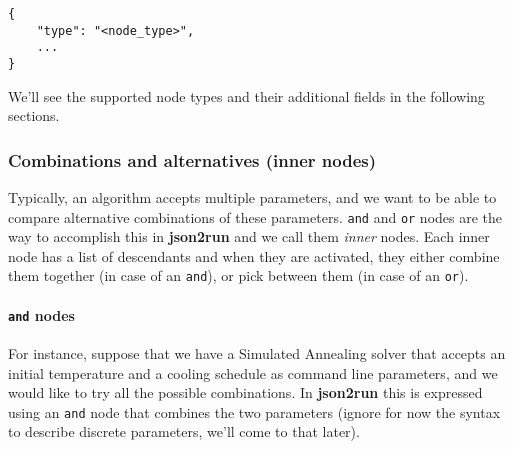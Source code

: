 \documentclass[11pt,notitlepage,twoside,a4paper]{article}
\begin{document}
\begin{lstlisting} 
{
    "type": "<node_type>",
    ... 
}
\end{lstlisting}

\noindent
We'll see the supported node types and their additional fields in the
following sections.

\subsubsection{Combinations and alternatives (inner nodes)}

Typically, an algorithm accepts multiple parameters, and we want to be
able to compare alternative combinations of these parameters.
\texttt{and} and \texttt{or} nodes are the way to accomplish this in
\textbf{json2run} and we call them \emph{inner} nodes. Each inner node
has a list of descendants and when they are activated, they either
combine them together (in case of an \texttt{and}), or pick between them
(in case of an \texttt{or}).

\paragraph{\texttt{and} nodes}

For instance, suppose that we have a Simulated Annealing \cite{Kirkpatrick1983} solver that accepts an initial temperature and a
cooling schedule as command line parameters, and we would like to try
all the possible combinations. In \textbf{json2run} this is expressed
using an \texttt{and} node that combines the two parameters (ignore for
now the syntax to describe discrete parameters, we'll come to that
later).
\end{document}
